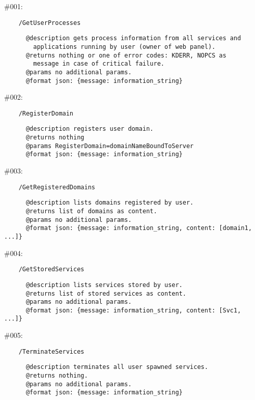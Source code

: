 \documentclass[11pt]{scrartcl}
\begin{document}
\begin{description}
    \item \#001:
      \begin{verbatim}
    /GetUserProcesses
      \end{verbatim}
      \begin{verbatim}
      @description gets process information from all services and
        applications running by user (owner of web panel).
      @returns nothing or one of error codes: KDERR, NOPCS as
        message in case of critical failure.
      @params no additional params.
      @format json: {message: information_string}
      \end{verbatim}

    \item \#002:
      \begin{verbatim}
    /RegisterDomain
      \end{verbatim}
      \begin{verbatim}
      @description registers user domain.
      @returns nothing
      @params RegisterDomain=domainNameBoundToServer
      @format json: {message: information_string}
      \end{verbatim}

    \item \#003:
      \begin{verbatim}
    /GetRegisteredDomains
      \end{verbatim}
      \begin{verbatim}
      @description lists domains registered by user.
      @returns list of domains as content.
      @params no additional params.
      @format json: {message: information_string, content: [domain1, ...]}
      \end{verbatim}

    \item \#004:
      \begin{verbatim}
    /GetStoredServices
      \end{verbatim}
      \begin{verbatim}
      @description lists services stored by user.
      @returns list of stored services as content.
      @params no additional params.
      @format json: {message: information_string, content: [Svc1, ...]}
      \end{verbatim}

    \item \#005:
      \begin{verbatim}
    /TerminateServices
      \end{verbatim}
      \begin{verbatim}
      @description terminates all user spawned services.
      @returns nothing.
      @params no additional params.
      @format json: {message: information_string}
      \end{verbatim}


\end{description}
\end{document}
